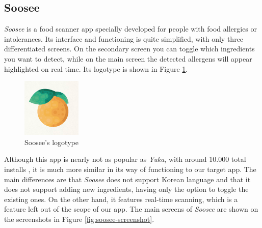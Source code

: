 \subsection{Soosee}

\textit{Soosee} \cite{noauthor_soosee_nodate-1} is a food scanner app specially developed for people with food allergies or intolerances. Its interface and functioning is quite simplified, with only three differentiated screens. On the secondary screen you can toggle which ingredients you want to detect, while on the main screen the detected allergens will appear highlighted on real time. Its logotype is shown in Figure \ref{fig:soosee}.

\begin{figure}[h]
  \centering
  \includegraphics[width=0.25\textwidth]{Figures/soosee.png}
  \caption{%
    Soosee's logotype
  }
  \label{fig:soosee}
\end{figure}

Although this app is nearly not as popular as \textit{Yuka}, with around 10.000 total installs \cite{noauthor_soosee_nodate}, it is much more similar in its way of functioning to our target app. The main differences are that \textit{Soosee} does not support Korean language and that it does not support adding new ingredients, having only the option to toggle the existing ones. On the other hand, it features real-time scanning, which is a feature left out of the scope of our app. The main screens of \textit{Soosee} are shown on the screenshots in Figure \ref{fig:soosee-screenshot}.

